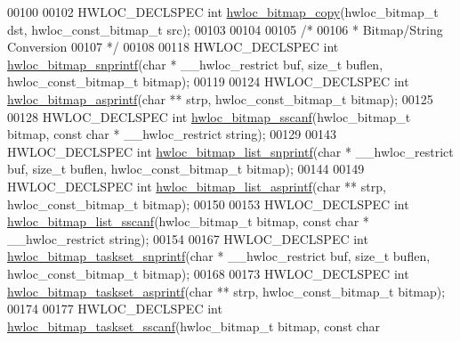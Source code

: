 \begin{DoxyCode}
00100 
00102 HWLOC\_DECLSPEC \textcolor{keywordtype}{int} \hyperlink{a00205_ga72a29824798b48784b8217471ec8f14c}{hwloc\_bitmap\_copy}(hwloc\_bitmap\_t dst, hwloc\_const\_bitmap\_t src);
00103 
00104 
00105 \textcolor{comment}{/*}
00106 \textcolor{comment}{ * Bitmap/String Conversion}
00107 \textcolor{comment}{ */}
00108 
00118 HWLOC\_DECLSPEC \textcolor{keywordtype}{int} \hyperlink{a00205_ga9511644657030a021dce9941e3cda583}{hwloc\_bitmap\_snprintf}(\textcolor{keywordtype}{char} * \_\_hwloc\_restrict buf, \textcolor{keywordtype}{size\_t} buflen, 
      hwloc\_const\_bitmap\_t bitmap);
00119 
00124 HWLOC\_DECLSPEC \textcolor{keywordtype}{int} \hyperlink{a00205_ga0fece972134fdecf2da9bc7a11dd827e}{hwloc\_bitmap\_asprintf}(\textcolor{keywordtype}{char} ** strp, hwloc\_const\_bitmap\_t bitmap);
00125 
00128 HWLOC\_DECLSPEC \textcolor{keywordtype}{int} \hyperlink{a00205_ga064a85c643a364b60acbfa0f3663fc18}{hwloc\_bitmap\_sscanf}(hwloc\_bitmap\_t bitmap, \textcolor{keyword}{const} \textcolor{keywordtype}{char} * 
      \_\_hwloc\_restrict \textcolor{keywordtype}{string});
00129 
00143 HWLOC\_DECLSPEC \textcolor{keywordtype}{int} \hyperlink{a00205_ga3d06e6447edeb61e56a9ad83f31f0a37}{hwloc\_bitmap\_list\_snprintf}(\textcolor{keywordtype}{char} * \_\_hwloc\_restrict buf, \textcolor{keywordtype}{size\_t}
       buflen, hwloc\_const\_bitmap\_t bitmap);
00144 
00149 HWLOC\_DECLSPEC \textcolor{keywordtype}{int} \hyperlink{a00205_ga39c0f1b02053de66d205c9f8260b3665}{hwloc\_bitmap\_list\_asprintf}(\textcolor{keywordtype}{char} ** strp, hwloc\_const\_bitmap\_t 
      bitmap);
00150 
00153 HWLOC\_DECLSPEC \textcolor{keywordtype}{int} \hyperlink{a00205_gaf9314311d482c621e17c6a53a9fe993e}{hwloc\_bitmap\_list\_sscanf}(hwloc\_bitmap\_t bitmap, \textcolor{keyword}{const} \textcolor{keywordtype}{char} * 
      \_\_hwloc\_restrict \textcolor{keywordtype}{string});
00154 
00167 HWLOC\_DECLSPEC \textcolor{keywordtype}{int} \hyperlink{a00205_ga5beb68a987fe48e5c5edef06ab260e14}{hwloc\_bitmap\_taskset\_snprintf}(\textcolor{keywordtype}{char} * \_\_hwloc\_restrict buf, \textcolor{keywordtype}{
      size\_t} buflen, hwloc\_const\_bitmap\_t bitmap);
00168 
00173 HWLOC\_DECLSPEC \textcolor{keywordtype}{int} \hyperlink{a00205_ga391312513f17c985d871f18367c59512}{hwloc\_bitmap\_taskset\_asprintf}(\textcolor{keywordtype}{char} ** strp, 
      hwloc\_const\_bitmap\_t bitmap);
00174 
00177 HWLOC\_DECLSPEC \textcolor{keywordtype}{int} \hyperlink{a00205_ga4f23db5041240e03e348752f8bd6ec2d}{hwloc\_bitmap\_taskset\_sscanf}(hwloc\_bitmap\_t bitmap, \textcolor{keyword}{const} \textcolor{keywordtype}{char}

\end{DoxyCode}
